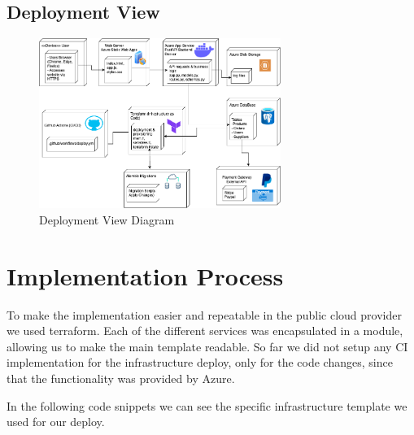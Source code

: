 \documentclass{llncs}
\begin{document}
\subsection{Deployment View}

\begin{figure}[H]
    \begin{center}
        \includegraphics[width=0.7\textwidth]{../diagrams/deployment.png}
        \vspace{0.01\textwidth}
        \caption{Deployment View Diagram}
        \label{DeploymentView} %
    \end{center}
\end{figure}


\section{Implementation Process}

To make the implementation easier and repeatable in the public cloud provider we used terraform.
Each of the different services was encapsulated in a module, allowing us to make the main template readable.
So far we did not setup any CI implementation for the infrastructure deploy, only for the code changes, since that the functionality was provided by Azure.

In the following code snippets we can see the specific infrastructure template we used for our deploy.
\end{document}
